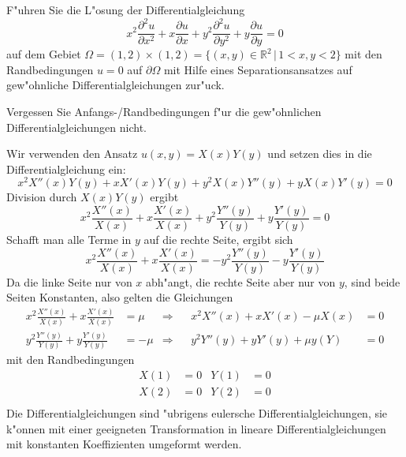 F"uhren Sie die L"osung der Differentialgleichung
\[
x^2\frac{\partial^2 u}{\partial x^2}
+x\frac{\partial u}{\partial x}
+y^2\frac{\partial^2 u}{\partial y^2}
+y\frac{\partial u}{\partial y}
=0
\]
auf dem Gebiet
$\Omega=(1,2)\times(1,2)=\{ (x,y)\in\mathbb R^2\,|\, 1<x,y<2\}$
mit den Randbedingungen
$u=0$ auf $\partial\Omega$
mit Hilfe eines Separationsansatzes auf gew"ohnliche Differentialgleichungen
zur"uck.

\begin{hinweis}
Vergessen Sie Anfangs-/Randbedingungen f"ur die gew"ohnlichen
Differentialgleichungen nicht.
\end{hinweis}

\begin{loesung}
Wir verwenden den Ansatz $u(x,y)=X(x)Y(y)$ und setzen dies in die
Differentialgleichung ein:
\[
x^2X''(x)Y(y)
+xX'(x)Y(y)
+y^2X(x)Y''(y)
+yX(x)Y'(y)=0
\]
Division durch $X(x)Y(y)$ ergibt
\[
x^2\frac{X''(x)}{X(x)}
+x\frac{X'(x)}{X(x)}
+y^2\frac{Y''(y)}{Y(y)}
+y\frac{Y'(y)}{Y(y)}=0
\]
Schafft man alle Terme in $y$ auf die rechte Seite, ergibt sich
\[
x^2\frac{X''(x)}{X(x)}
+x\frac{X'(x)}{X(x)}
=
-y^2\frac{Y''(y)}{Y(y)}
-y\frac{Y'(y)}{Y(y)}
\]
Da die linke Seite nur von $x$ abh"angt, die rechte Seite aber nur
von $y$, sind beide Seiten Konstanten, also gelten die
Gleichungen
\begin{align*}
x^2\frac{X''(x)}{X(x)}
+x\frac{X'(x)}{X(x)}&=\mu
&\Rightarrow&
&
x^2X''(x)+xX'(x)-\mu X(x)&=0
\\
y^2\frac{Y''(y)}{Y(y)}
+y\frac{Y'(y)}{Y(y)}&=-\mu
&\Rightarrow&
&
y^2Y''(y)+yY'(y)+\mu y(Y)&=0
\end{align*}
mit den Randbedingungen
\begin{align*}
X(1)&=0&Y(1)&=0\\
X(2)&=0&Y(2)&=0\\
\end{align*}
Die Differentialgleichungen sind "ubrigens eulersche Differentialgleichungen,
sie k"onnen mit einer geeigneten Transformation in lineare
Differentialgleichungen mit konstanten Koeffizienten umgeformt werden.
\end{loesung}
